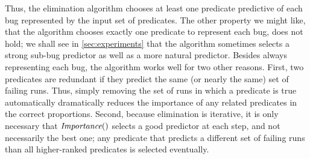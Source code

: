 Thus, the elimination algorithm chooses at least one predicate 
predictive of each bug represented by the input set of predicates.
The other property we might like, that the algorithm chooses exactly
one predicate to represent each bug, does not hold; we shall see in
\autoref{sec:experiments} that the algorithm sometimes selects a
strong sub-bug predictor as well as a more natural predictor.  Besides
always representing each bug, the algorithm works well for two other
reasons.  First, two predicates are redundant if they predict the same
(or nearly the same) set of failing runs.  Thus, simply removing the
set of runs in which a predicate is true automatically dramatically
reduces the importance of any related predicates in the correct
proportions. Second, because elimination is
iterative, it is only necessary that $\textit{Importance}()$ selects a good
predictor at each step, and not necessarily the best one; any
predicate that predicts a different set of failing runs than all
higher-ranked predicates is selected eventually.


